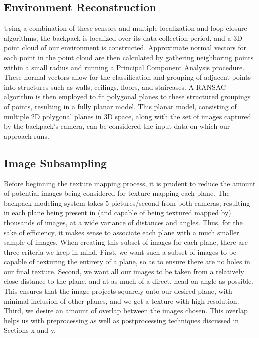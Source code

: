 \documentclass[10pt,twocolumn,letterpaper]{article}
\begin{document}
\subsection{Environment Reconstruction}
Using a combination of these sensors and multiple localization and loop-closure algorithms, the backpack is localized over its data collection period, and a 3D point cloud of our environment is constructed. Approximate normal vectors for each point in the point cloud are then calculated by gathering neighboring points within a small radius and running a Principal Component Analysis procedure. These normal vectors allow for the classification and grouping of adjacent points into structures such as walls, ceilings, floors, and staircases. A RANSAC algorithm is then employed to fit polygonal planes to these structured groupings of points, resulting in a fully planar model. This planar model, consisting of multiple 2D polygonal planes in 3D space, along with the set of images captured by the backpack's camera, can be considered the input data on which our approach runs.

\subsection{Image Subsampling}
Before beginning the texture mapping process, it is prudent to reduce the amount of potential images being considered for texture mapping each plane. The backpack modeling system takes 5 pictures/second from both cameras, resulting in each plane being present in (and capable of being textured mapped by) thousands of images, at a wide variance of distances and angles. Thus, for the sake of efficiency, it makes sense to associate each plane with a much smaller sample of images. When creating this subset of images for each plane, there are three criteria we keep in mind. First, we want such a subset of images to be capable of texturing the entirety of a plane, so as to ensure there are no holes in our final texture. Second, we want all our images to be taken from a relatively close distance to the plane, and at as much of a direct, head-on angle as possible. This ensures that the image projects squarely onto our desired plane, with minimal inclusion of other planes, and we get a texture with high resolution. Third, we desire an amount of overlap between the images chosen. This overlap helps us with preprocessing as well as postprocessing techniques discussed in Sections x and y.
\end{document}
